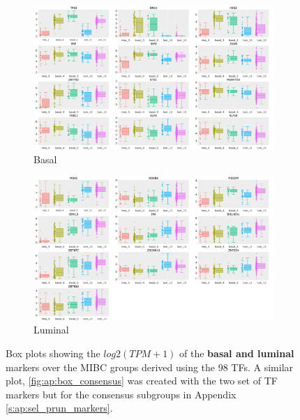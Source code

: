 \begin{figure}[H]
    \centering
    \begin{subfigure}[!t]{1.0\textwidth}
        \includegraphics[width=1.0\textwidth,height=1.0\textheight,keepaspectratio]{Sections/Network_I/Resources/selective_pruning/log2_dendrogram_basal.png}
        \caption{Basal}
        \label{fig:N_I:box_basal_dendrogram}
    \end{subfigure}
    \begin{subfigure}[!t]{1.0\textwidth}
      \includegraphics[width=1.0\textwidth,height=1.0\textheight,keepaspectratio]{Sections/Network_I/Resources/selective_pruning/log2_dendrogram_lum.png}
      \caption{Luminal}
      \label{fig:N_I:box_luminal_dendrogram}
    \end{subfigure}
    \caption{Box plots showing the $log2(TPM+1)$ of the \textbf{basal and luminal} markers over the MIBC groups derived using the 98 TFs. A similar plot, \cref{fig:ap:box_consensus} was created with the two set of TF markers but for the consensus \citep{Kamoun2020-tj} subgroups in Appendix \cref{s:ap:sel_prun_markers}.}
    \label{fig:N_I:box_basal}
\end{figure}


